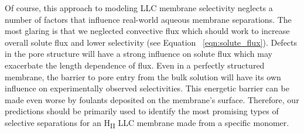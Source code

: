 \documentclass{article}
\begin{document}
  Of course, this approach to modeling LLC membrane selectivity neglects a number of
  factors that influence real-world aqueous membrane separations. The most glaring is 
  that we neglected convective flux which should work to increase overall solute flux 
  and lower selectivity (see Equation ~\ref{eqn:solute_flux}). Defects in the pore 
  structure will have a strong influence on solute flux which may exacerbate the length 
  dependence of flux. Even in a perfectly structured membrane, the barrier to pore
  entry from the bulk solution will have its own influence on experimentally observed 
  selectivities. This energetic barrier can be made even worse by foulants deposited on
  the membrane's surface. Therefore, our predictions should be primarily used to 
  identify the most promising types of selective separations for an H\textsubscript{II}
  LLC membrane made from a specific monomer.

  
  
\end{document}
